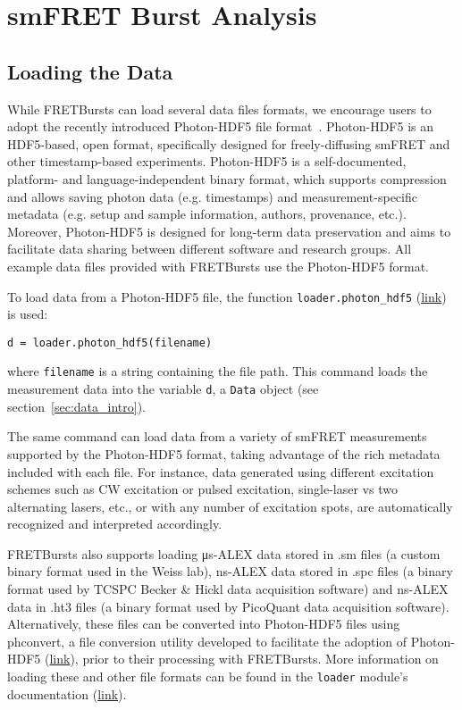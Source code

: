 \section{smFRET Burst Analysis}
\label{sec:analysis}

\subsection{Loading the Data}
\label{sec:dataload}
While FRETBursts can load several data files formats,
we encourage users to adopt the recently introduced Photon-HDF5 file format~\cite{Ingargiola2016}.
Photon-HDF5 is an HDF5-based, open format, specifically designed for freely-diffusing smFRET and 
other timestamp-based experiments.
Photon-HDF5 is a self-documented, platform- and language-independent binary format,
which supports compression and allows saving photon data (e.g. timestamps) and measurement-specific metadata
(e.g. setup and sample information, authors, provenance, etc.).
Moreover, Photon-HDF5 is designed for long-term data preservation and aims to facilitate data sharing
between different software and research groups.
All example data files provided with FRETBursts use the Photon-HDF5 format.

To load data from a Photon-HDF5 file, the function \verb|loader.photon_hdf5|
(\href{http://fretbursts.readthedocs.org/en/latest/loader.html#fretbursts.loader.photon_hdf5}{link})
is used:

\begin{lstlisting}
d = loader.photon_hdf5(filename)
\end{lstlisting}

\noindent
where \verb|filename| is a string containing the file path.
This command loads the measurement data into the variable \verb|d|, 
a \verb|Data| object (see section~\ref{sec:data_intro}).

The same command can load data from a variety of smFRET measurements supported
by the Photon-HDF5 format, taking advantage of the rich metadata included with each file.
For instance, data generated using different excitation schemes such as CW excitation 
or pulsed excitation, single-laser vs two alternating lasers, etc., 
or with any number of excitation spots, are automatically recognized and interpreted accordingly.

FRETBursts also supports loading μs-ALEX data stored in .sm files
(a custom binary format used in the Weiss lab),
ns-ALEX data stored in .spc files (a binary format used by TCSPC Becker \& Hickl data acquisition software) 
and ns-ALEX data in .ht3 files (a binary format used by PicoQuant data acquisition software).
Alternatively, these files can be converted into Photon-HDF5 files using phconvert, 
a file conversion utility developed to facilitate the adoption of Photon-HDF5 
(\href{http://photon-hdf5.github.io/phconvert/}{link}), prior to their processing with FRETBursts.
More information on loading these and other file formats 
can be found in the \verb|loader| module's documentation
(\href{http://fretbursts.readthedocs.org/en/latest/loader.html}{link}).

